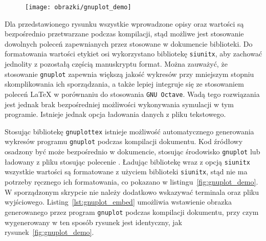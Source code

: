 \begin{listing}[hbt]
\inputminted{gnuplot}{skrypty/gnuplot_demo.gnuplot}
\end{listing}

\begin{figure}[!htb]
\texttt{[image: obrazki/gnuplot\_demo]}
\end{figure}

Dla przedstawionego rysunku wszystkie wprowadzone opisy oraz wartości są bezpośrednio przetwarzane podczas kompilacji, stąd możliwe jest stosowanie dowolnych poleceń zapewnianych przez stosowane w dokumencie biblioteki. Do formatowania wartości etykiet osi wykorzystano bibliotekę \texttt{siunitx}, aby zachować jednolity z pozostałą częścią manuskryptu format. Można zauważyć, że stosowanie \texttt{gnuplot} zapewnia większą jakość wykresów przy mniejszym stopniu skomplikowania ich sporządzania, a także lepiej integruje się ze stosowaniem poleceń \LaTeX{} w porównaniu do stosowania \texttt{GNU Octave}. Wadą tego rozwiązania jest jednak brak bezpośredniej możliwości wykonywania symulacji w tym programie. Istnieje jednak opcja ładowania danych z pliku tekstowego.

Stosując bibliotekę \texttt{gnuplottex} istnieje możliwość automatycznego generowania wykresów programu \texttt{gnuplot} podczas kompilacji dokumentu. Kod źródłowy osadzony być może bezpośrednio w dokumencie, stosując środowisko \texttt{gnuplot} lub ładowany z pliku stosując polecenie \texttt{}. Ładując bibliotekę wraz z opcją \texttt{siunitx} wszystkie wartości są formatowane z użyciem biblioteki \texttt{siunitx}, stąd nie ma potrzeby ręcznego ich formatowania, co pokazano w listingu~\ref{fig:gnuplot_demo}. W sporządzonym skrypcie nie należy dodatkowo wskazywać terminala oraz pliku wyjściowego. Listing~\ref{lst:gnuplot_embed} umożliwia wstawienie obrazka generowanego przez program \texttt{gnuplot} podczas kompilacji dokumentu, przy czym wygenerowany w ten sposób rysunek jest identyczny, jak rysunek~\ref{fig:gnuplot_demo}.

\begin{listing}[hbt]
\inputminted{latex}{obrazki/gnuplot_embed.tex}
\end{listing}

